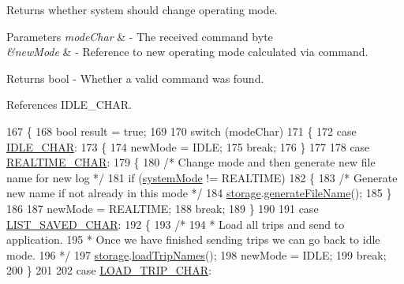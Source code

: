 Returns whether system should change operating mode. 


\begin{DoxyParams}{Parameters}
{\em mode\+Char} & -\/ The received command byte \\
\hline
{\em \&new\+Mode} & -\/ Reference to new operating mode calculated via command. \\
\hline
\end{DoxyParams}
\begin{DoxyReturn}{Returns}
bool -\/ Whether a valid command was found. 
\end{DoxyReturn}


References I\+D\+L\+E\+\_\+\+C\+H\+AR.


\begin{DoxyCode}
167 \{
168   \textcolor{keywordtype}{bool} result = \textcolor{keyword}{true};
169 
170   \textcolor{keywordflow}{switch} (modeChar)
171   \{
172     \textcolor{keywordflow}{case} \hyperlink{logging-device_8ino_ad7f0721d7856c100a69be7fa82e2865b}{IDLE\_CHAR}:
173     \{
174       newMode = IDLE;
175       \textcolor{keywordflow}{break};
176     \}
177 
178     \textcolor{keywordflow}{case} \hyperlink{logging-device_8ino_a911a5839eebf5e3d5927f4f77e9bfb62}{REALTIME\_CHAR}:
179     \{
180       \textcolor{comment}{/* Change mode and then generate new file name for new log */}
181       \textcolor{keywordflow}{if} (\hyperlink{logging-device_8ino_a13a2ecbcf455940dd240e54e9e39cf7a}{systemMode} != REALTIME)
182       \{
183         \textcolor{comment}{/* Generate new name if not already in this mode */}
184         \hyperlink{logging-device_8ino_a40059244119c00baa1b841119cfd1b2e}{storage}.\hyperlink{class_logging_device_1_1_storage_a571ce9630665d9407ffbaeff55c47b0a}{generateFileName}();
185       \}
186 
187       newMode = REALTIME;
188       \textcolor{keywordflow}{break};
189     \}
190 
191     \textcolor{keywordflow}{case} \hyperlink{logging-device_8ino_a4ffb22b7b0017657087830d24f68a323}{LIST\_SAVED\_CHAR}:
192     \{
193       \textcolor{comment}{/*}
194 \textcolor{comment}{       * Load all trips and send to application.}
195 \textcolor{comment}{       * Once we have finished sending trips we can go back to idle mode.}
196 \textcolor{comment}{       */}
197       \hyperlink{logging-device_8ino_a40059244119c00baa1b841119cfd1b2e}{storage}.\hyperlink{class_logging_device_1_1_storage_a4831b2e8ecfa22da6971f5a8690cc4e3}{loadTripNames}();
198       newMode = IDLE;
199       \textcolor{keywordflow}{break};
200     \}
201 
202     \textcolor{keywordflow}{case} \hyperlink{logging-device_8ino_aa72e33a6bcfedf9118f573741b4e137b}{LOAD\_TRIP\_CHAR}:

\end{DoxyCode}
